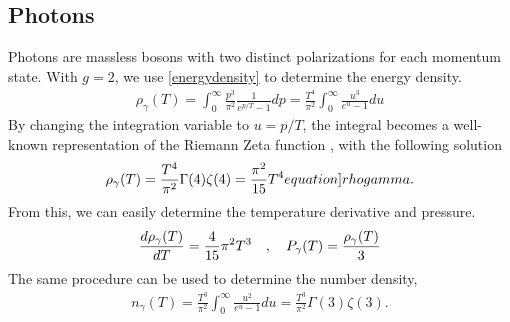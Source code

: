 \subsection{Photons}
Photons are massless bosons with two distinct polarizations for each momentum state. With $g=2$, we use \eqref{energydensity} to determine the energy density. 
\begin{align}
    \rho_\gamma(T)=\int_{0}^{\infty} \frac{p^3}{\pi^2}\frac{1}{e^{p/T}-1}dp =  \frac{T^4}{\pi^2}\int_{0}^{\infty}\frac{u^3}{e^{u}-1}du
\end{align}
By changing the integration variable to $u=p/T$, the integral becomes a well-known representation of the Riemann Zeta function \cite[\href{https://dlmf.nist.gov/25.5.E1}{(25.5.1)}]{NIST:DLMF}, with the following solution
\begin{align}
    \rho_\gamma(T)=\frac{T^4}{\pi^2}\Gamma(4)\zeta(4)=\frac{\pi^2}{15}T^4
    \label[equation]{rhogamma}.
\end{align}
From this, we can easily determine the temperature derivative and pressure.
\begin{align}
    \frac{d\rho_\gamma(T)}{dT}=\frac{4}{15}\pi^2T^3 \quad , \quad P_\gamma(T)=\frac{\rho_\gamma(T)}{3}
\end{align}
The same procedure can be used to determine the number density,
\begin{align}
    n_\gamma(T)=\frac{T^3}{\pi^2}\int_{0}^{\infty}\frac{u^2}{e^{u}-1}du=\frac{T^3}{\pi^2}\Gamma(3)\zeta(3)
    \label{eq:ngamma}.
\end{align}



